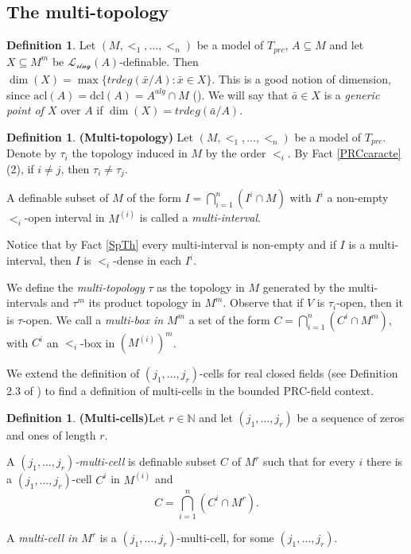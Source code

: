 \documentclass[12pt]{article}
\theoremstyle{definition}
\newtheorem{defi}[thm]{Definition}
\theoremstyle{mystyle}
\theoremstyle{remark}
\newcommand{\LCR}{\mathcal{L_{\text{ring}}}}
\newcommand{\clos}[2]{#1^{(#2)}}
\newcommand{\acl}{\mathrm{acl}}
\newcommand{\dcl}{\mathrm{dcl}}
\begin{document}
\subsection{The multi-topology}


\begin{defi}
Let $(M, <_1, \ldots, <_n)$ be a model of $T_{prc}$, $A \subseteq
M$ and let $X \subseteq M^m$ be $\LCR(A)$-definable. Then
$\dim(X)= \max\{trdeg(\bar{x}/A): \bar{x} \in X\}$. This is a good
notion of dimension, since $\acl(A)= \dcl(A)= A^{alg} \cap M$
(\cite[Lemma 2.6]{Mon}). We will say that $\bar{a} \in X$ is a
\emph{generic point of $X$} over $A$ if $\dim(X) = trdeg(\bar{a}/A)$.
\end{defi}


\begin{defi}\textbf{(Multi-topology)}
 Let $(M, <_1, \ldots, <_n)$ be a model of $T_{prc}$.
Denote by $\tau_i$ the topology induced in $M$ by the order $<_i$.
By Fact \ref{PRCcaracte} (2), if $i \not = j$, then $\tau_i \not = \tau_j$.

A definable subset of $M$ of the form $I=
\displaystyle{\bigcap_{i=1}^n (I^i\cap M)}$ with $I^i$ a non-empty
$<_i$-open interval in $\clos{M}{i}$ is called a
\emph{multi-interval}.

Notice that by Fact \ref{SpTh} every multi-interval is non-empty
and if $I$ is a multi-interval, then $I$ is $<_i$-dense in each
$I^i$.

We define the \emph{multi-topology} $\tau$ as the topology in $M$
generated by the multi-intervals and  $\tau^m$ its product
topology in $M^m$. Observe that if $V$ is $\tau_i$-open, then it
is $\tau$-open. We call a \emph{multi-box in $M^m$} a set of the
form  $C= \displaystyle{\bigcap_{i=1}^n (C^i\cap M^m)}$, with
$C^i$ an $<_i$-box in $(\clos{M}{i})^m$.
\end{defi}

\medskip

We extend the definition of $(j_1, \ldots, j_r)$-cells for real
closed fields (see Definition 2.3 of \cite{Van2}) to find a
definition of multi-cells in the bounded PRC-field context.

\begin{defi}\textbf{(Multi-cells)}\label{Multi-cells}
Let $r \in \mathbb{N}$ and let $(j_1, \ldots, j_r)$ be a sequence
of zeros and ones of length $r$.

A \emph{$(j_1, \ldots, j_r)$-multi-cell} is definable subset $C$
of $M^r$ such that for every $i$ there is a $(j_1, \ldots,
j_r)$-cell $C^i$ in $\clos{M}{i}$ and
\[C= \displaystyle{\bigcap_{i=1}^n (C^i\cap
M^r)}.\]

\medskip

A \emph{multi-cell in $M^r$} is a $(j_1, \ldots, j_r)$-multi-cell,
for some $(j_1, \ldots, j_r)$.
\end{defi}
\end{document}
